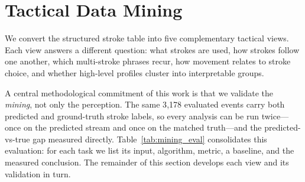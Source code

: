 \section{Tactical Data Mining}

We convert the structured stroke table into five complementary tactical views.
Each view answers a different question: what strokes are used, how strokes
follow one another, which multi-stroke phrases recur, how movement relates to
stroke choice, and whether high-level profiles cluster into interpretable
groups.

A central methodological commitment of this work is that we validate the
\emph{mining}, not only the perception. The same 3{,}178 evaluated events carry
both predicted and ground-truth stroke labels, so every analysis can be run
twice---once on the predicted stream and once on the matched truth---and the
predicted-vs-true gap measured directly. Table~\ref{tab:mining_eval}
consolidates this evaluation: for each task we list its input, algorithm,
metric, a baseline, and the measured conclusion. The remainder of this section
develops each view and its validation in turn.

